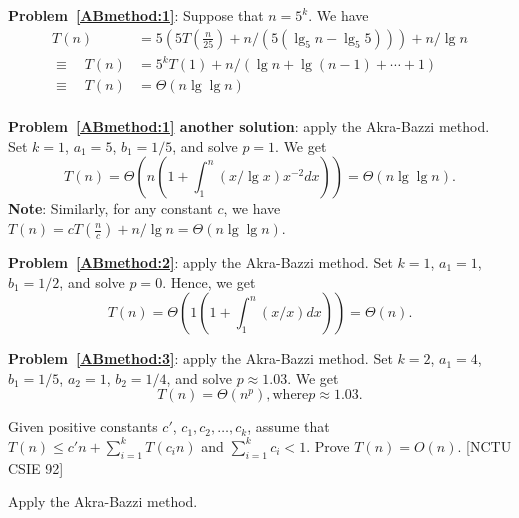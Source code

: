 \begin{Answer}
{\bf Problem~\ref{ABmethod:1}}: Suppose that $n = 5^k$. We have
\begin{align*}
 T(n)  & = 5(5T(\frac{n}{25}) + n/(5(\lg_5 n - \lg_5 5))) + n/\lg n \\
\equiv \quad T(n) & = 5^kT(1) + n/(\lg n + \lg (n-1) + \cdots + 1) \\
\equiv  \quad T(n) &=  \Theta(n \lg \lg n) \\
\end{align*}

{\bf Problem~\ref{ABmethod:1} another solution}: apply the Akra\--Bazzi method. Set $k = 1$, $a_1 = 5$, $b_1 = 1/5$, and solve $p = 1$. We get
\[ T(n) = \Theta( n (1 + \int_{1}^n (x / \lg x) x^{-2} dx)) = \Theta(n \lg \lg n). \]
\textbf{Note}: Similarly, for any constant $c$, we have $T(n) = cT(\frac{n}{c}) + n/\lg n = \Theta(n \lg \lg n)$.

{\bf Problem~\ref{ABmethod:2}}: apply the Akra\--Bazzi method. Set $k = 1$, $a_1 = 1$, $b_1 = 1/2$, and solve $p = 0$. Hence, we get
\[ T(n) = \Theta( 1 (1 + \int_{1}^n (x / x) dx)) = \Theta(n). \]

{\bf Problem~\ref{ABmethod:3}}: apply the Akra\--Bazzi method. Set $k = 2$, $a_1 = 4$, $b_1 = 1/5$, $a_2 = 1$, $b_2 = 1/4$, and solve $p \approx 1.03$. We get
\[ T(n) = \Theta( n^{p}), \text{where} p \approx 1.03. \]

\end{Answer}

\begin{Exercise}
Given positive constants $c'$, $c_1, c_2, \dots, c_k$, assume that $T(n) \leq  c'n + \sum_{i=1}^k T(c_in)$ and $\sum_{i=1}^k c_i < 1$. Prove $T(n) = O(n)$. [NCTU CSIE 92] 
\end{Exercise}
\begin{Answer}
Apply the Akra\--Bazzi method.
\end{Answer}


